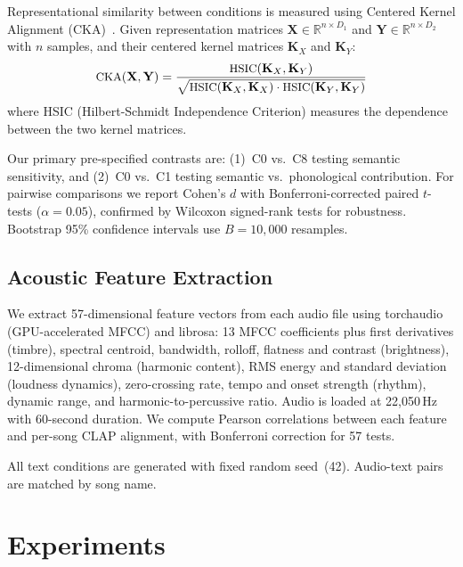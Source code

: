 \documentclass[11pt]{article}
\begin{document}
Representational similarity between conditions is measured using Centered Kernel Alignment (CKA)~\citep{kornblith2019cka}. Given representation matrices $\mathbf{X} \in \mathbb{R}^{n \times D_1}$ and $\mathbf{Y} \in \mathbb{R}^{n \times D_2}$ with $n$ samples, and their centered kernel matrices $\mathbf{K}_X$ and $\mathbf{K}_Y$:
\begin{equation}\label{eq:cka}
\small\text{CKA}(\mathbf{X}, \mathbf{Y}) = \frac{\text{HSIC}(\mathbf{K}_X, \mathbf{K}_Y)}{\sqrt{\text{HSIC}(\mathbf{K}_X, \mathbf{K}_X) \cdot \text{HSIC}(\mathbf{K}_Y, \mathbf{K}_Y)}}
\end{equation}
where HSIC (Hilbert-Schmidt Independence Criterion) measures the dependence between the two kernel matrices.

Our primary pre-specified contrasts are: (1)~C0 vs.\ C8 testing semantic sensitivity, and (2)~C0 vs.\ C1 testing semantic vs.\ phonological contribution. For pairwise comparisons we report Cohen's $d$ with Bonferroni-corrected paired $t$-tests ($\alpha{=}0.05$), confirmed by Wilcoxon signed-rank tests for robustness. Bootstrap 95\% confidence intervals use $B{=}10{,}000$ resamples.

\subsection{Acoustic Feature Extraction}\label{sec:audio_features}

We extract 57-dimensional feature vectors from each audio file using torchaudio (GPU-accelerated MFCC) and librosa: 13 MFCC coefficients plus first derivatives (timbre), spectral centroid, bandwidth, rolloff, flatness and contrast (brightness), 12-dimensional chroma (harmonic content), RMS energy and standard deviation (loudness dynamics), zero-crossing rate, tempo and onset strength (rhythm), dynamic range, and harmonic-to-percussive ratio. Audio is loaded at 22{,}050\,Hz with 60-second duration. We compute Pearson correlations between each feature and per-song CLAP alignment, with Bonferroni correction for 57 tests.

All text conditions are generated with fixed random seed~(42). Audio-text pairs are matched by song name.

\section{Experiments}\label{sec:exp}
\end{document}
